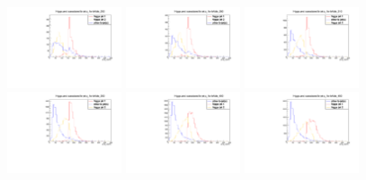 \begin{figure}[H]
    \includegraphics[width=0.3\textwidth]{SignalKin/jet_pt_compare_bAbb_250.pdf}
    \includegraphics[width=0.3\textwidth]{SignalKin/jet_pt_compare_bAbb_280.pdf}
    \includegraphics[width=0.3\textwidth]{SignalKin/jet_pt_compare_bAbb_310.pdf}
    \newline
    \includegraphics[width=0.3\textwidth]{SignalKin/jet_pt_compare_bAbb_350.pdf}
    \includegraphics[width=0.3\textwidth]{SignalKin/jet_pt_compare_bAbb_400.pdf}
    \includegraphics[width=0.3\textwidth]{SignalKin/jet_pt_compare_bAbb_450.pdf}
    \newline

\end{figure}
